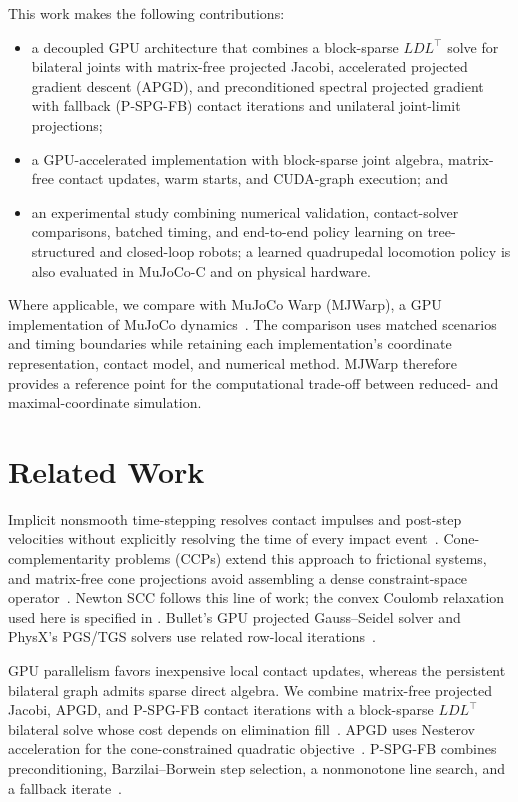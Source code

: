 \documentclass{article}
\theoremstyle{plain}
\theoremstyle{definition}
\begin{document}
This work makes the following contributions:
\begin{itemize}
  \item a decoupled GPU architecture that combines a block-sparse $LDL^\top$
        solve for bilateral joints with matrix-free projected Jacobi,
        accelerated projected gradient descent (APGD), and preconditioned
        spectral projected gradient with fallback (P-SPG-FB) contact
        iterations and unilateral joint-limit projections;
  \item a GPU-accelerated implementation with block-sparse joint algebra,
        matrix-free contact updates, warm starts, and CUDA-graph execution; and
  \item an experimental study combining numerical validation,
        contact-solver comparisons, batched timing,
        and end-to-end policy learning on tree-structured and closed-loop
        robots; a learned quadrupedal locomotion policy is also evaluated
        in MuJoCo-C and on physical hardware.
\end{itemize}
Where applicable, we compare with MuJoCo Warp (MJWarp), a GPU implementation of
MuJoCo dynamics~\cite{mujocowarp2026}. The comparison uses matched scenarios
and timing boundaries while retaining each implementation's coordinate
representation, contact model, and numerical method. MJWarp therefore
provides a reference point for the computational trade-off between reduced-
and maximal-coordinate simulation.

\section{Related Work}
\label{sec:related}

Implicit nonsmooth time-stepping resolves contact impulses and post-step
velocities without explicitly resolving the time of every impact
event~\cite{stewart1996,anitescu2006}.
Cone-complementarity problems (CCPs) extend this approach to frictional systems,
and matrix-free cone projections avoid assembling a dense constraint-space
operator~\cite{tasora2011}. Newton SCC follows this line of work; the convex
Coulomb relaxation used here is specified in .
Bullet's GPU projected Gauss--Seidel solver and PhysX's PGS/TGS solvers use
related row-local iterations~\cite{coumans2014bullet,nvidia2026physx}.

GPU parallelism favors inexpensive local contact updates, whereas the
persistent bilateral graph admits sparse direct algebra. We combine
matrix-free projected Jacobi, APGD, and P-SPG-FB contact iterations with a
block-sparse $LDL^\top$ bilateral solve whose cost depends on elimination
fill~\cite{davis2006}. APGD uses Nesterov acceleration for the cone-constrained
quadratic objective~\cite{nesterov1983,heyn2013}. P-SPG-FB combines
preconditioning, Barzilai--Borwein step selection, a nonmonotone line search,
and a fallback iterate~\cite{barzilai1988,birgin2000,heyn2013krylov,tasora2013pspgfb}.
\end{document}
